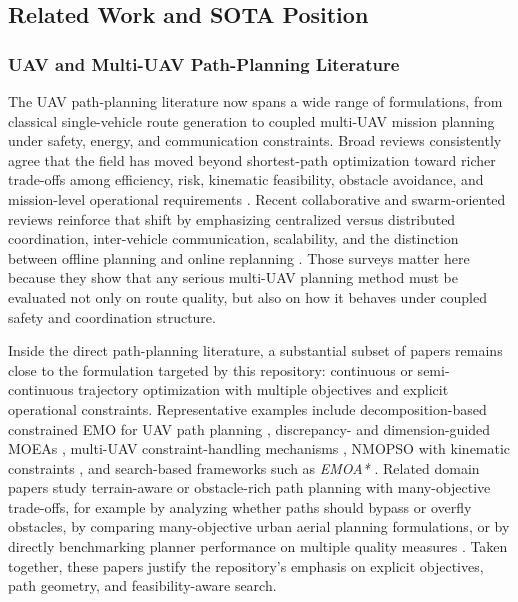 \documentclass[a4paper,fleqn]{cas-dc}
\begin{document}
\subsection{Related Work and SOTA Position}

\subsubsection{UAV and Multi-UAV Path-Planning Literature}

The UAV path-planning literature now spans a wide range of formulations, from classical single-vehicle route generation to coupled multi-UAV mission planning under safety, energy, and communication constraints. Broad reviews consistently agree that the field has moved beyond shortest-path optimization toward richer trade-offs among efficiency, risk, kinematic feasibility, obstacle avoidance, and mission-level operational requirements \cite{ref1,ref11,ref12,ref13,ref14}. Recent collaborative and swarm-oriented reviews reinforce that shift by emphasizing centralized versus distributed coordination, inter-vehicle communication, scalability, and the distinction between offline planning and online replanning \cite{ref2,ref7,ref8,ref9,ref31}. Those surveys matter here because they show that any serious multi-UAV planning method must be evaluated not only on route quality, but also on how it behaves under coupled safety and coordination structure.

Inside the direct path-planning literature, a substantial subset of papers remains close to the formulation targeted by this repository: continuous or semi-continuous trajectory optimization with multiple objectives and explicit operational constraints. Representative examples include decomposition-based constrained EMO for UAV path planning \cite{ref15}, discrepancy- and dimension-guided MOEAs \cite{ref16}, multi-UAV constraint-handling mechanisms \cite{ref17}, NMOPSO with kinematic constraints \cite{ref18}, and search-based frameworks such as \textit{EMOA*} \cite{ref20}. Related domain papers study terrain-aware or obstacle-rich path planning with many-objective trade-offs, for example by analyzing whether paths should bypass or overfly obstacles, by comparing many-objective urban aerial planning formulations, or by directly benchmarking planner performance on multiple quality measures \cite{ref21,ref22,ref23}. Taken together, these papers justify the repository's emphasis on explicit objectives, path geometry, and feasibility-aware search.
\end{document}
